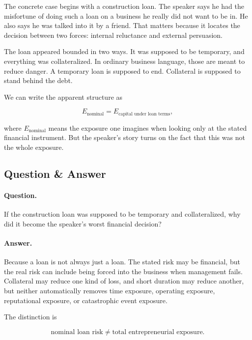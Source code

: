 The concrete case begins with a construction loan. The speaker says he had the misfortune of doing such a loan on a business he really did not want to be in. He also says he was talked into it by a friend. That matters because it locates the decision between two forces: internal reluctance and external persuasion.

The loan appeared bounded in two ways. It was supposed to be temporary, and everything was collateralized. In ordinary business language, those are meant to reduce danger. A temporary loan is supposed to end. Collateral is supposed to stand behind the debt.

We can write the apparent structure as

\begin{equation}
E_{\text{nominal}}
=
E_{\text{capital under loan terms}},
\end{equation}

where \(E_{\text{nominal}}\) means the exposure one imagines when looking only at the stated financial instrument. But the speaker's story turns on the fact that this was not the whole exposure.

\subsection{Question \& Answer}

\paragraph{Question.}
If the construction loan was supposed to be temporary and collateralized, why did it become the speaker's worst financial decision?

\paragraph{Answer.}
Because a loan is not always just a loan. The stated risk may be financial, but the real risk can include being forced into the business when management fails. Collateral may reduce one kind of loss, and short duration may reduce another, but neither automatically removes time exposure, operating exposure, reputational exposure, or catastrophic event exposure.

The distinction is

\begin{equation}
\text{nominal loan risk}
\neq
\text{total entrepreneurial exposure}.
\end{equation}

